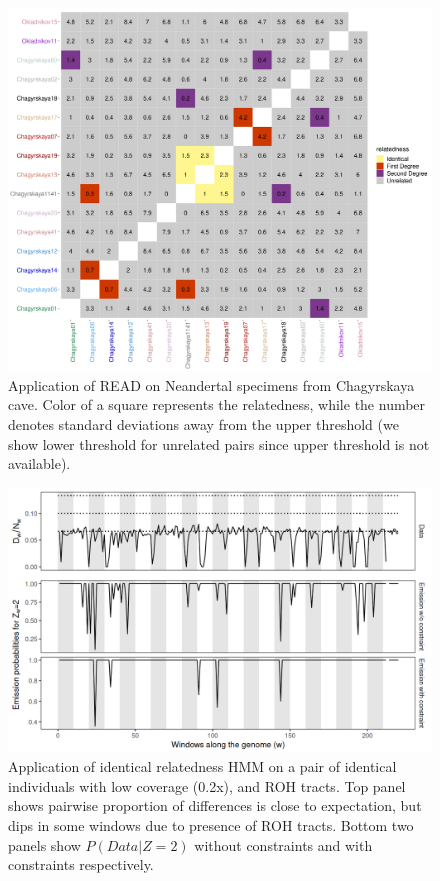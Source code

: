 \documentclass[12pt, letterpaper]{article}
\begin{document}
\begin{figure}[h!]
    \includegraphics[width=18cm]{supplementary_info/plots/fil0_read_plot.png}
    \centering
    \caption{Application of READ on Neandertal specimens from Chagyrskaya cave. Color of a square represents the relatedness, while the number denotes standard deviations away from the upper threshold (we show lower threshold for unrelated pairs since upper threshold is not available).}
    \label{figS2:Chagyrskaya_READ}
\end{figure}


\begin{figure}[h!]
    \includegraphics[width=18cm]{supplementary_info/plots/contam0_inbred1_run57_coverage0.2_asc0_inputMode_hapProbs_fil0_pair0_15_relid_emissions_bnds.png}
    \centering
    \caption{Application of identical relatedness HMM on a pair of identical individuals with low coverage (0.2x), and ROH tracts. Top panel shows pairwise proportion of differences is close to expectation, but dips in some windows due to presence of ROH tracts. Bottom two panels show $P(Data|Z=2)$ without constraints and with constraints respectively.}
    \label{figS3:bnds}
\end{figure}
\end{document}
